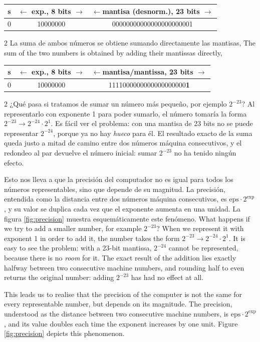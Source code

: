 \begin{center}
\begin{tabular}{|c||c||c|}
\hline
s&$\leftarrow$ exp., 8 bits $\rightarrow$&$\leftarrow$mantisa \textbf{(desnorm.)}, 23 bits $\rightarrow$\\
\hline
0&10000000&00000000000000000000001\\
\hline
\end{tabular}
\end{center}

\begin{paracol}{2}
La suma de ambos números se obtiene sumando directamente las mantisas,
\switchcolumn
The sum of the two numbers is obtained by adding their mantissas directly,
\end{paracol}

\begin{center}
\begin{tabular}{|c||c||c|}
\hline
s&$\leftarrow$ exp., 8 bits $\rightarrow$&$\leftarrow$mantisa/mantissa, 23 bits $\rightarrow$\\
\hline
0&10000000&1111000000000000000000\textbf{1}\\
\hline
\end{tabular}
\end{center}

\begin{paracol}{2}
¿Qué pasa si tratamos de sumar un número más pequeño, por ejemplo $2^{-23}$? Al representarlo con exponente 1 para poder sumarlo, el número tomaría la forma $2^{-23}\rightarrow 2^{-24}\cdot2^{1}$. Es fácil ver el problema: con una mantisa de 23 bits no se puede representar $2^{-24}$, porque ya no hay \emph{hueco} para él. El resultado exacto de la suma queda justo a mitad de camino entre dos números máquina consecutivos, y el redondeo al par devuelve el número inicial: sumar $2^{-23}$ no ha tenido ningún efecto.

Esto nos lleva a que la precisión del computador no es igual para todos los números representables, sino que depende de su magnitud. La precisión, entendida como la distancia entre dos números máquina consecutivos, es $\text{eps}\cdot 2^{\text{exp}}$, y su valor se duplica cada vez que el exponente aumenta en una unidad. La figura \ref{fig:precision} muestra esquemáticamente este fenómeno.
\switchcolumn
What happens if we try to add a smaller number, for example $2^{-23}$? When we represent it with exponent 1 in order to add it, the number takes the form $2^{-23}\rightarrow 2^{-24}\cdot2^{1}$. It is easy to see the problem: with a 23-bit mantissa, $2^{-24}$ cannot be represented, because there is no \emph{room} for it. The exact result of the addition lies exactly halfway between two consecutive machine numbers, and rounding half to even returns the original number: adding $2^{-23}$ has had no effect at all.

This leads us to realise that the precision of the computer is not the same for every representable number, but depends on its magnitude. The precision, understood as the distance between two consecutive machine numbers, is $\text{eps}\cdot 2^{\text{exp}}$, and its value doubles each time the exponent increases by one unit. Figure \ref{fig:precision} depicts this phenomenon.
\end{paracol}

